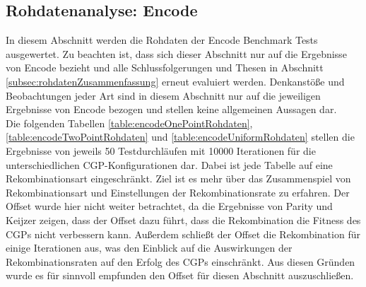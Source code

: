 \subsection{Rohdatenanalyse: Encode}
\label{subsec:rohdatenEncode}

In diesem Abschnitt werden die Rohdaten der Encode Benchmark Tests ausgewertet.
Zu beachten ist, dass sich dieser Abschnitt nur auf die Ergebnisse von Encode bezieht und alle Schlussfolgerungen und Thesen in Abschnitt \ref{subsec:rohdatenZusammenfassung} erneut evaluiert werden.
Denkanstöße und Beobachtungen jeder Art sind in diesem Abschnitt nur auf die jeweiligen Ergebnisse von Encode bezogen und stellen keine allgemeinen Aussagen dar.\\
Die folgenden Tabellen \ref{table:encodeOnePointRohdaten}, \ref{table:encodeTwoPointRohdaten} und \ref{table:encodeUniformRohdaten} stellen die Ergebnisse von jeweils 50 Testdurchläufen mit 10000 Iterationen für die unterschiedlichen CGP-Konfigurationen dar. 
Dabei ist jede Tabelle auf eine Rekombinationsart eingeschränkt.
Ziel ist es mehr über das Zusammenspiel von Rekombinationsart und Einstellungen der Rekombinationsrate zu erfahren.
Der Offset wurde hier nicht weiter betrachtet, da die Ergebnisse von Parity und Keijzer zeigen, dass der Offset dazu führt, dass die Rekombination die Fitness des CGPs nicht verbessern kann.
Außerdem schließt der Offset die Rekombination für einige Iterationen aus, was den Einblick auf die Auswirkungen der Rekombinationsraten auf den Erfolg des CGPs einschränkt.
Aus diesen Gründen wurde es für sinnvoll empfunden den Offset für diesen Abschnitt auszuschließen.

